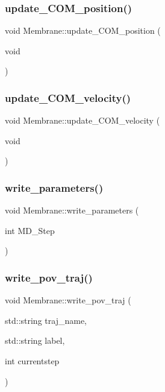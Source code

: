 \subsubsection{\texorpdfstring{update\_COM\_position()}{update\_COM\_position()}}
{\footnotesize\ttfamily void Membrane\+::update\+\_\+\+C\+O\+M\+\_\+position (\begin{DoxyParamCaption}\item[{void}]{ }\end{DoxyParamCaption})\hspace{0.3cm}{\ttfamily [inline]}}

\mbox{\label{classMembrane_aa1bb3ec5f5b6c6451e2f72103fbdde08}} 
\subsubsection{\texorpdfstring{update\_COM\_velocity()}{update\_COM\_velocity()}}
{\footnotesize\ttfamily void Membrane\+::update\+\_\+\+C\+O\+M\+\_\+velocity (\begin{DoxyParamCaption}\item[{void}]{ }\end{DoxyParamCaption})\hspace{0.3cm}{\ttfamily [inline]}}

\mbox{\label{classMembrane_a1cf1d4947d79a4529239f292534b9e19}} 
\subsubsection{\texorpdfstring{write\_parameters()}{write\_parameters()}}
{\footnotesize\ttfamily void Membrane\+::write\+\_\+parameters (\begin{DoxyParamCaption}\item[{int}]{M\+D\+\_\+\+Step }\end{DoxyParamCaption})}

\mbox{\label{classMembrane_a4b2c1a070787e45652d2055311b9685d}} 
\subsubsection{\texorpdfstring{write\_pov\_traj()}{write\_pov\_traj()}}
{\footnotesize\ttfamily void Membrane\+::write\+\_\+pov\+\_\+traj (\begin{DoxyParamCaption}\item[{std\+::string}]{traj\+\_\+name,  }\item[{std\+::string}]{label,  }\item[{int}]{currentstep }\end{DoxyParamCaption})}

